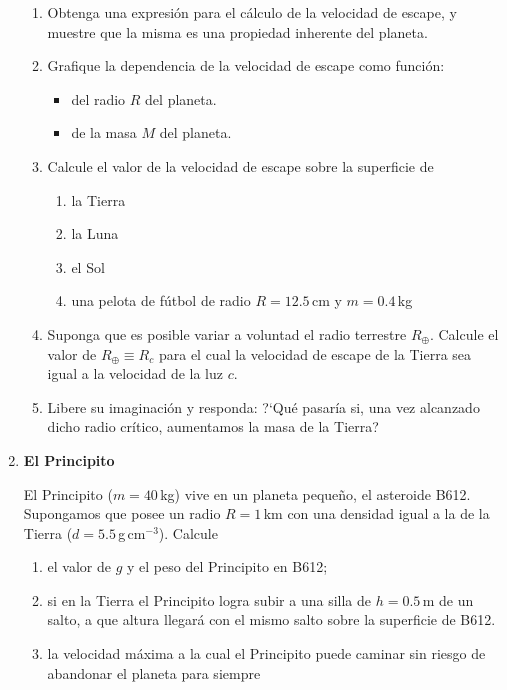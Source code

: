 \documentclass[a4paper,12pt]{article}
\begin{document}
\begin{enumerate}
\begin{enumerate}
\item Obtenga una expresión para el cálculo de la velocidad de escape, y
muestre que la misma es una propiedad inherente del planeta.
\item Grafique la dependencia de la velocidad de escape como función:
\begin{itemize}
\item del radio $R$ del planeta.
\item de la masa $M$ del planeta.
\end{itemize}
\item Calcule el valor de la velocidad de escape sobre la superficie de 
\begin{enumerate}
\item la Tierra
\item la Luna
\item el Sol 
\item una pelota de fútbol de radio $R=12.5$\,cm y $m=0.4$\,kg 
\end{enumerate}
\item Suponga que es posible variar a voluntad el radio terrestre $R_\oplus$.
Calcule el valor de $R_\oplus \equiv R_c$ para el cual la velocidad de escape
de la Tierra sea igual a la velocidad de la luz $c$.
\item Libere su imaginación y responda: ?`Qué pasaría si, una vez alcanzado
dicho radio crítico, aumentamos la masa de la Tierra?
\end{enumerate}

\item {\bf{El Principito}}

El Principito ($m=40$\,kg) vive en un planeta pequeño, el asteroide B612.
Supongamos que posee un radio $R = 1$\,km con una densidad igual a la de la
Tierra ($d = 5.5$\,g\,cm$^{-3}$). Calcule
\begin{enumerate}
\item el valor de $g$ y el peso del Principito en B612;
\item si en la Tierra el Principito logra subir a una silla de $h=0.5$\,m de un
salto, a que altura llegará con el mismo salto sobre la superficie de B612.
\item la velocidad máxima a la cual el Principito puede caminar sin riesgo de
abandonar el planeta para siempre
\end{enumerate}
\end{enumerate}
\end{document}

